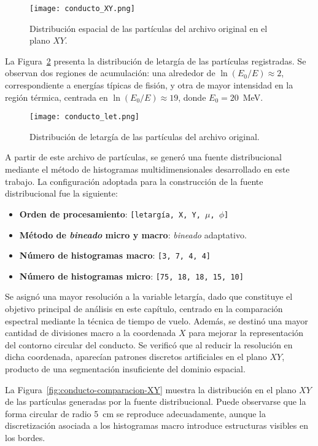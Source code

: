 \begin{figure}[h]
\centering
\texttt{[image: conducto\_XY.png]}
\caption{Distribución espacial de las partículas del archivo original en el plano $XY$.}
\label{fig:conducto-XY}
\end{figure}

La Figura~\ref{fig:conducto-let} presenta la distribución de letargía de las partículas registradas. Se observan dos regiones de acumulación: una alrededor de $\ln(E_0/E) \approx 2$, correspondiente a energías típicas de fisión, y otra de mayor intensidad en la región térmica, centrada en $\ln(E_0/E) \approx 19$, donde $E_0 = 20$~MeV.

\begin{figure}[h]
\centering
\texttt{[image: conducto\_let.png]}
\caption{Distribución de letargía de las partículas del archivo original.}
\label{fig:conducto-let}
\end{figure}

A partir de este archivo de partículas, se generó una fuente distribucional mediante el método de histogramas multidimensionales desarrollado en este trabajo. La configuración adoptada para la construcción de la fuente distribucional fue la siguiente:

\begin{itemize}
\item \textbf{Orden de procesamiento}: \texttt{[letargía, X, Y, $\mu$, $\phi$]}
\item \textbf{Método de \textit{bineado} micro y macro}: \textit{bineado} adaptativo.
\item \textbf{Número de histogramas macro}: \texttt{[3, 7, 4, 4]}
\item \textbf{Número de histogramas micro}: \texttt{[75, 18, 18, 15, 10]}
\end{itemize}

Se asignó una mayor resolución a la variable letargía, dado que constituye el objetivo principal de análisis en este capítulo, centrado en la comparación espectral mediante la técnica de tiempo de vuelo. Además, se destinó una mayor cantidad de divisiones macro a la coordenada $X$ para mejorar la representación del contorno circular del conducto. Se verificó que al reducir la resolución en dicha coordenada, aparecían patrones discretos artificiales en el plano $XY$, producto de una segmentación insuficiente del dominio espacial.

La Figura~\ref{fig:conducto-comparacion-XY} muestra la distribución en el plano $XY$ de las partículas generadas por la fuente distribucional. Puede observarse que la forma circular de radio 5~cm se reproduce adecuadamente, aunque la discretización asociada a los histogramas macro introduce estructuras visibles en los bordes.

